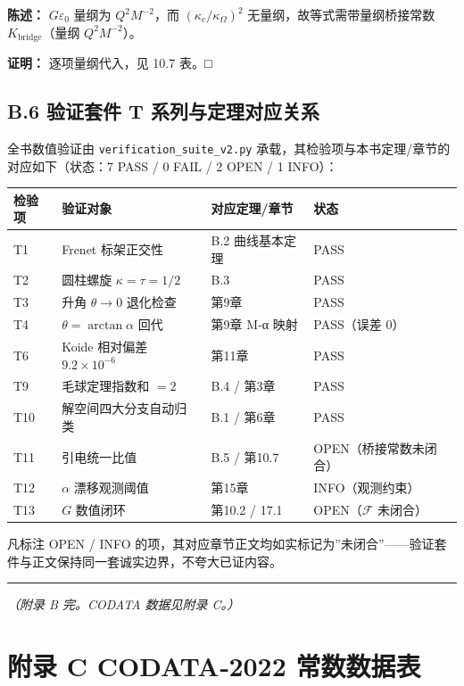 \textbf{陈述：} \(G\varepsilon_0\) 量纲为 \(Q^2M^{-2}\)，而
\((\kappa_e/\kappa_\Omega)^2\) 无量纲，故等式需带量纲桥接常数
\(K_{\mathrm{bridge}}\)（量纲 \(Q^2M^{-2}\)）。

\textbf{证明：} 逐项量纲代入，见 10.7 表。□

\subsection{B.6 验证套件 T
系列与定理对应关系}\label{b.6-ux9a8cux8bc1ux5957ux4ef6-t-ux7cfbux5217ux4e0eux5b9aux7406ux5bf9ux5e94ux5173ux7cfb}

全书数值验证由 \texttt{verification\_suite\_v2.py}
承载，其检验项与本书定理/章节的对应如下（状态：7 PASS / 0 FAIL / 2 OPEN
/ 1 INFO）：

\begin{longtable}[]{@{}llll@{}}
\toprule\noalign{}
检验项 & 验证对象 & 对应定理/章节 & 状态 \\
\midrule\noalign{}
\endhead
\bottomrule\noalign{}
\endlastfoot
T1 & Frenet 标架正交性 & B.2 曲线基本定理 & PASS \\
T2 & 圆柱螺旋 \(\kappa=\tau=1/2\) & B.3 & PASS \\
T3 & 升角 \(\theta\to0\) 退化检查 & 第9章 & PASS \\
T4 & \(\theta=\arctan\alpha\) 回代 & 第9章 M‑α 映射 & PASS（误差 0） \\
T6 & Koide 相对偏差 \(9.2\times10^{-6}\) & 第11章 & PASS \\
T9 & 毛球定理指数和 \(=2\) & B.4 / 第3章 & PASS \\
T10 & 解空间四大分支自动归类 & B.1 / 第6章 & PASS \\
T11 & 引电统一比值 & B.5 / 第10.7 & OPEN（桥接常数未闭合） \\
T12 & \(\alpha\) 漂移观测阈值 & 第15章 & INFO（观测约束） \\
T13 & \(G\) 数值闭环 & 第10.2 / 17.1 & OPEN（\(\mathcal{F}\) 未闭合） \\
\end{longtable}

凡标注 OPEN / INFO
的项，其对应章节正文均如实标记为''未闭合''------验证套件与正文保持同一套诚实边界，不夸大已证内容。

\begin{center}\rule{0.5\linewidth}{0.5pt}\end{center}

\emph{（附录 B 完。CODATA 数据见附录 C。）}

\section{附录 C CODATA‑2022
常数数据表}\label{ux9644ux5f55-c-codata2022-ux5e38ux6570ux6570ux636eux8868}

